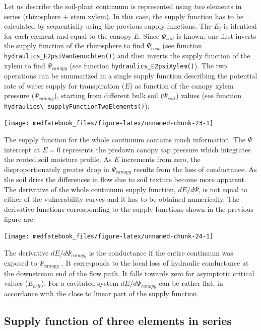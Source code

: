 \documentclass[]{book}
\begin{document}
Let us describe the soil-plant continuum is represented using \emph{two}
elements in series (rhizosphere + stem xylem). In this case, the supply
function has to be calculated by sequentially using the previous supply
functions. The \(E_i\) is identical for each element and equal to the
canopy \(E\). Since \(\Psi_{soil}\) is known, one first inverts the
supply function of the rhizosphere to find \(\Psi_{root}\) (see function
\texttt{hydraulics\_E2psiVanGenuchten()}) and then inverts the supply
function of the xylem to find \(\Psi_{canopy}\) (see function
\texttt{hydraulics\_E2psiXylem()}). The two operations can be summarized
in a single supply function describing the potential rate of water
supply for transpiration (\(E\)) as function of the canopy xylem
pressure (\(\Psi_{canopy}\)), starting from different bulk soil
(\(\Psi_{soil}\)) values (see function
\texttt{hydraulics\textbackslash{}\_supplyFunctionTwoElements()}):

\begin{center}\texttt{[image: medfatebook\_files/figure-latex/unnamed-chunk-23-1]} \end{center}

The supply function for the whole continuum contains much information.
The \(\Psi\) intercept at \(E=0\) represents the predawn canopy sap
pressure which integrates the rooted soil moisture profile. As \(E\)
increments from zero, the disproportionately greater drop in
\(\Psi_{canopy}\) results from the loss of conductance. As the soil
dries the differences in flow due to soil texture become more apparent.
The derivative of the whole continuum supply function, \(dE/d\Psi\), is
not equal to either of the vulnerability curves and it has to be
obtained numerically. The derivative functions corresponding to the
supply functions shown in the previous figure are:

\begin{center}\texttt{[image: medfatebook\_files/figure-latex/unnamed-chunk-24-1]} \end{center}

The derivative \(dE/d\Psi_{canopy}\) is the conductance if the entire
continuum was exposed to \(\Psi_{canopy}\) \citep{Sperry2015}. It
corresponds to the local loss of hydraulic conductance at the downstream
end of the flow path. It falls towards zero for asymptotic critical
values (\(E_{crit}\)). For a cavitated system \(dE/d\Psi_{canopy}\) can
be rather flat, in accordance with the close to linear part of the
supply function.

\subsection{Supply function of three elements in
series}\label{supply-function-of-three-elements-in-series}
\end{document}
